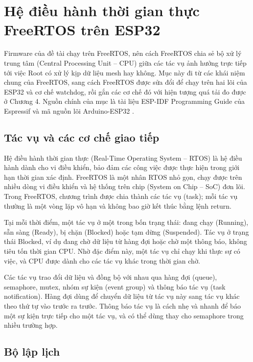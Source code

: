 \section{Hệ điều hành thời gian thực FreeRTOS trên ESP32}\label{sec:2.4}

Firmware của đề tài chạy trên FreeRTOS, nên cách FreeRTOS chia sẻ bộ xử lý trung tâm (Central Processing Unit – CPU) giữa các tác vụ ảnh hưởng trực tiếp tới việc Root có xử lý kịp dữ liệu mesh hay không. Mục này đi từ các khái niệm chung của FreeRTOS, sang cách FreeRTOS được sửa đổi để chạy trên hai lõi của ESP32 và cơ chế watchdog, rồi gắn các cơ chế đó với hiện tượng quá tải đo được ở Chương 4. Nguồn chính của mục là tài liệu ESP-IDF Programming Guide của Espressif \citep{espressif_freertos_idf,espressif_wdts} và mã nguồn lõi Arduino-ESP32 \citep{espressif_arduino_2017}.


\subsection{Tác vụ và các cơ chế giao tiếp}

Hệ điều hành thời gian thực (Real-Time Operating System – RTOS) là hệ điều hành dành cho vi điều khiển, bảo đảm các công việc được thực hiện trong giới hạn thời gian xác định. FreeRTOS là một nhân RTOS nhỏ gọn, chạy được trên nhiều dòng vi điều khiển và hệ thống trên chip (System on Chip – SoC) đơn lõi. Trong FreeRTOS, chương trình được chia thành các tác vụ (task); mỗi tác vụ thường là một vòng lặp vô hạn và không bao giờ kết thúc bằng lệnh return.

Tại mỗi thời điểm, một tác vụ ở một trong bốn trạng thái: đang chạy (Running), sẵn sàng (Ready), bị chặn (Blocked) hoặc tạm dừng (Suspended). Tác vụ ở trạng thái Blocked, ví dụ đang chờ dữ liệu từ hàng đợi hoặc chờ một thông báo, không tiêu tốn thời gian CPU. Nhờ đặc điểm này, một tác vụ chỉ chạy khi thực sự có việc, và CPU được dành cho các tác vụ khác trong thời gian chờ.

Các tác vụ trao đổi dữ liệu và đồng bộ với nhau qua hàng đợi (queue), semaphore, mutex, nhóm sự kiện (event group) và thông báo tác vụ (task notification). Hàng đợi dùng để chuyển dữ liệu từ tác vụ này sang tác vụ khác theo thứ tự vào trước ra trước. Thông báo tác vụ là cách nhẹ và nhanh để báo một sự kiện trực tiếp cho một tác vụ, và có thể dùng thay cho semaphore trong nhiều trường hợp.


\subsection{Bộ lập lịch}

